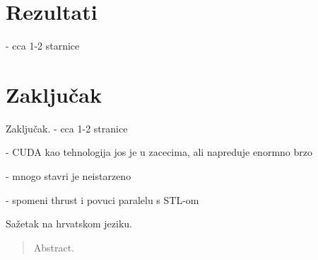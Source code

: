 \documentclass[times, utf8, zavrsni]{fer}
\begin{document}
\chapter{Rezultati}
- cca 1-2 starnice







\chapter{Zaključak}
Zaključak.
- cca 1-2 stranice

- CUDA kao tehnologija jos je u zacecima, ali napreduje enormno brzo

- mnogo stavri je neistarzeno

- spomeni thrust i povuci paralelu s STL-om







{}


\begin{sazetak}
Sažetak na hrvatskom jeziku.

\end{sazetak}

\begin{abstract}
Abstract.

\end{abstract}
\end{document}

